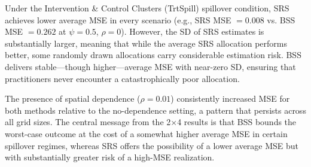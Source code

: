 \documentclass{article}[11pt]
\begin{document}
Under the Intervention \& Control Clusters (TrtSpill) spillover condition, SRS achieves lower average MSE in every scenario (e.g., SRS MSE $= 0.008$ vs. BSS MSE $= 0.262$ at $\psi = 0.5$, $\rho = 0$). However, the SD of SRS estimates is substantially larger, meaning that while the average SRS allocation performs better, some randomly drawn allocations carry considerable estimation risk. BSS delivers stable---though higher---average MSE with near-zero SD, ensuring that practitioners never encounter a catastrophically poor allocation.

The presence of spatial dependence ($\rho = 0.01$) consistently increased MSE for both methods relative to the no-dependence setting, a pattern that persists across all grid sizes. The central message from the 2$\times$4 results is that BSS bounds the worst-case outcome at the cost of a somewhat higher average MSE in certain spillover regimes, whereas SRS offers the possibility of a lower average MSE but with substantially greater risk of a high-MSE realization.


\end{document}
